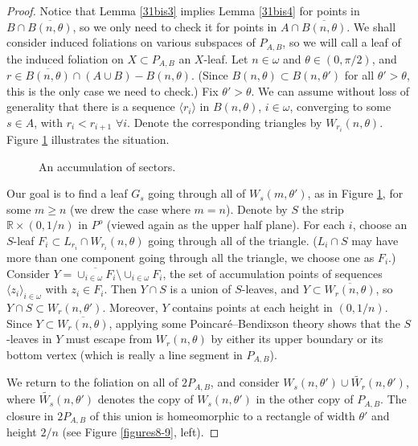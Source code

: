 \documentclass{amsart}
\begin{document}
\begin{proof}
Notice that Lemma \ref{31bis3} implies Lemma \ref{31bis4} for points in $B\cap{\overline{{B(n,\theta)}}}$, so we only need to check it for points in $A\cap{\overline{{B(n,\theta)}}}$. We shall consider induced foliations on various subspaces of $P_{A,B}$, so we will call a leaf of the induced foliation on $X\subset P_{A,B}$ an $X$-leaf. Let $n\in\omega$ and $\theta\in(0,\pi/2)$, and $r\in{\overline{{B(n,\theta)}}}\cap (A\cup B) - B(n,\theta)$. (Since $B(n,\theta)\subset B(n,\theta')$ for all $\theta'>\theta$, this is the only case we need to check.) Fix $\theta'>\theta$. We can assume without loss of generality that there is a sequence $\langle r_i\rangle$ in $B(n,\theta)$, $i\in\omega$, converging to some $s\in A$, with $r_i<r_{i+1}$ $\forall i$. Denote the corresponding triangles by $W_{r_i}(n,\theta)$. Figure \ref{figure5} illustrates the situation.
 
\begin{figure}[h]
\centering
    \caption{\label{figure5} An accumulation of sectors.}
\end{figure}

Our goal is to find a leaf $G_s$ going through all of $W_s(m,\theta')$, as in Figure \ref{figure5}, for some $m\ge n$ (we drew the case where $m=n$). Denote by $S$ the strip ${\mathbb R}\times (0,1/n)$ in $P^o$ (viewed again as the upper half plane). For each $i$, choose an $S$-leaf $F_i\subset L_{r_i}\cap W_{r_i}(n,\theta)$ going through all of the triangle. ($L_i\cap S$ may have more than one component going through all the triangle, we choose one as $F_i$.) Consider $Y={\overline{{\cup_{i\in\omega} F_i}}} \setminus \cup_{i\in\omega} F_i$, the set of accumulation points of sequences $\langle z_i\rangle_{i\in\omega}$ with $z_i\in F_i$. Then $Y\cap S$ is a union of $S$-leaves, and $Y\subset {\overline{{W_r(n,\theta)}}}$, so $Y\cap S\subset W_r(n,\theta')$. Moreover, $Y$ contains points at each height in $(0,1/n)$. Since $Y\subset {\overline{{W_r(n,\theta)}}}$, applying some Poincar\'e--Bendixson theory shows that the $S$-leaves in $Y$ must escape from $W_r(n,\theta)$ by either its upper boundary or its bottom vertex (which is really a line segment in $P_{A,B}$).
   
We return to the foliation on all of $2P_{A,B}$, and consider $W_s(n,\theta')\cup{\widetilde{{W_r}}}(n,\theta')$, where ${\widetilde{{W_s}}}(n,\theta')$ denotes the copy of $W_s(n,\theta')$ in the other copy of $P_{A,B}$. The closure in $2P_{A,B}$ of this union is homeomorphic to a rectangle of width $\theta'$ and height $2/n$ (see Figure \ref{figures8-9}, left).


\end{proof}
\end{document}
